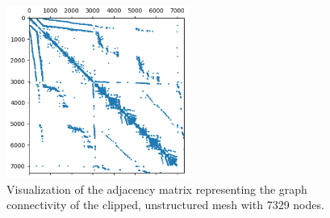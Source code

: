 \begin{figure}[ht]
    \centering
    \includegraphics[width=6cm]{images/Methodology/AdjMatrix.png}
    \caption{Visualization of the adjacency matrix representing the graph connectivity of the clipped, unstructured mesh with 7329 nodes.}
    \label{adjmat}
\end{figure}
